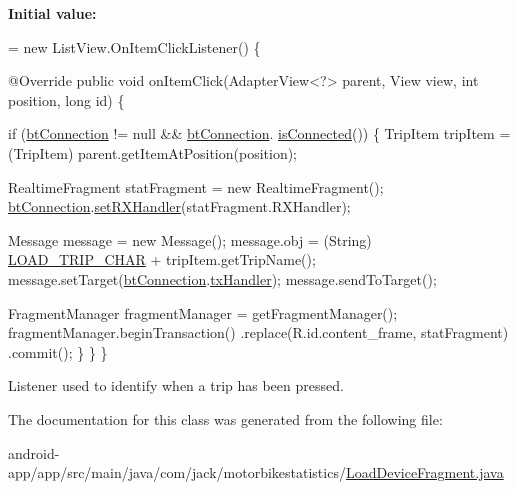 {\bfseries Initial value\+:}
\begin{DoxyCode}
= \textcolor{keyword}{new} ListView.OnItemClickListener() \{

        
        @Override
        \textcolor{keyword}{public} \textcolor{keywordtype}{void} onItemClick(AdapterView<?> parent, View view, \textcolor{keywordtype}{int} position, \textcolor{keywordtype}{long} \textcolor{keywordtype}{id}) \{

            \textcolor{keywordflow}{if} (\hyperlink{classcom_1_1jack_1_1motorbikestatistics_1_1_load_device_fragment_a7a446c4528638e9d169481c3ff1471b0}{btConnection} != null && \hyperlink{classcom_1_1jack_1_1motorbikestatistics_1_1_load_device_fragment_a7a446c4528638e9d169481c3ff1471b0}{btConnection}.
      \hyperlink{classcom_1_1jack_1_1motorbikestatistics_1_1_b_t_connection_a22f33e46d9f460d78865d4c63b645357}{isConnected}()) \{
                TripItem tripItem = (TripItem) parent.getItemAtPosition(position);

                
                RealtimeFragment statFragment = \textcolor{keyword}{new} RealtimeFragment();
                \hyperlink{classcom_1_1jack_1_1motorbikestatistics_1_1_load_device_fragment_a7a446c4528638e9d169481c3ff1471b0}{btConnection}.\hyperlink{classcom_1_1jack_1_1motorbikestatistics_1_1_b_t_connection_aae8ee75e78f5beff98572bf3b13a60b8}{setRXHandler}(statFragment.RXHandler);

                
                Message message = \textcolor{keyword}{new} Message();
                message.obj = (String) \hyperlink{classcom_1_1jack_1_1motorbikestatistics_1_1_load_device_fragment_a484328e2963103665fae8801557bef73}{LOAD\_TRIP\_CHAR} + tripItem.getTripName();
                message.setTarget(\hyperlink{classcom_1_1jack_1_1motorbikestatistics_1_1_load_device_fragment_a7a446c4528638e9d169481c3ff1471b0}{btConnection}.\hyperlink{classcom_1_1jack_1_1motorbikestatistics_1_1_b_t_connection_a7a88b2007af6a9a5c8667a9f1df980cc}{txHandler});
                message.sendToTarget();

                FragmentManager fragmentManager = getFragmentManager();
                fragmentManager.beginTransaction()
                        .replace(R.id.content\_frame, statFragment)
                        .commit();
            \}
        \}
    \}
\end{DoxyCode}


Listener used to identify when a trip has been pressed. 



The documentation for this class was generated from the following file\+:\begin{DoxyCompactItemize}
\item 
android-\/app/app/src/main/java/com/jack/motorbikestatistics/\hyperlink{_load_device_fragment_8java}{Load\+Device\+Fragment.\+java}\end{DoxyCompactItemize}
